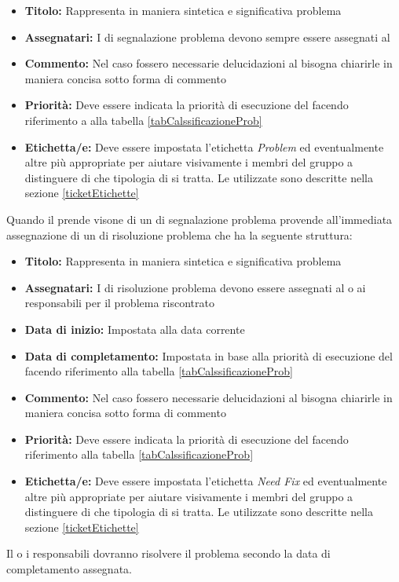 \documentclass[12pt,a4paper]{article}
\begin{document}
\begin{itemize}
	\item \textbf{Titolo:} Rappresenta in maniera sintetica e significativa problema
	\item \textbf{Assegnatari:} I  di segnalazione problema devono sempre essere assegnati al \RE
	\item \textbf{Commento:} Nel caso fossero necessarie delucidazioni al  bisogna chiarirle in maniera concisa sotto forma di commento
	\item \textbf{Priorità:} Deve essere indicata la priorità di esecuzione del  facendo riferimento a alla tabella \ref{tabCalssificazioneProb}
	\item \textbf{Etichetta/e:} Deve essere impostata l'etichetta \textit{Problem} ed eventualmente altre  più appropriate  per aiutare visivamente i membri del gruppo a distinguere di che tipologia di  si tratta. Le  utilizzate sono descritte nella sezione \ref{ticketEtichette}
\end{itemize}

Quando il \RE{} prende visone di un  di segnalazione problema provende all'immediata assegnazione di un  di risoluzione problema che ha la seguente struttura:

\begin{itemize}
	\item \textbf{Titolo:} Rappresenta in maniera sintetica e significativa problema
	\item \textbf{Assegnatari:} I  di risoluzione problema devono essere assegnati al o ai responsabili per il problema riscontrato
	\item \textbf{Data di inizio:} Impostata alla data corrente
	\item \textbf{Data di completamento:} Impostata in base alla priorità di esecuzione del  facendo riferimento alla tabella \ref{tabCalssificazioneProb}
	\item \textbf{Commento:} Nel caso fossero necessarie delucidazioni al  bisogna chiarirle in maniera concisa sotto forma di commento
	\item \textbf{Priorità:} Deve essere indicata la priorità di esecuzione del  facendo riferimento alla tabella \ref{tabCalssificazioneProb}
	\item \textbf{Etichetta/e:} Deve essere impostata l'etichetta \textit{Need Fix} ed eventualmente altre  più appropriate  per aiutare visivamente i membri del gruppo a distinguere di che tipologia di  si tratta. Le  utilizzate sono descritte nella sezione \ref{ticketEtichette}
\end{itemize}
Il o i responsabili dovranno risolvere il problema secondo la data di completamento assegnata.
\end{document}
